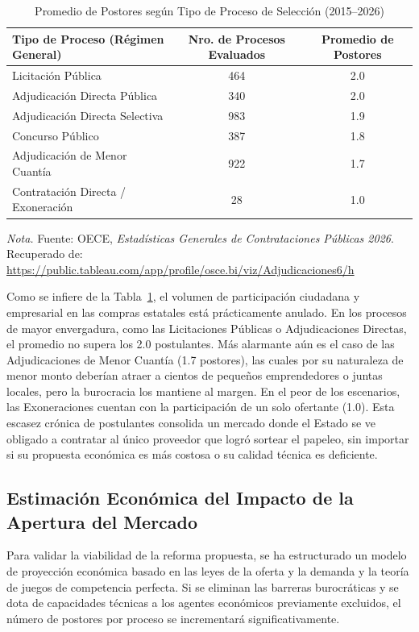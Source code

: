\documentclass[12pt,a4paper]{article}
\begin{document}
\begin{table}[htbp]
\caption{Promedio de Postores según Tipo de Proceso de Selección (2015--2026)}
\label{tab:promedio_postores}
\centering
\begin{tabular}{lcc}
\toprule
\textbf{Tipo de Proceso (Régimen General)} & \textbf{Nro. de Procesos Evaluados} & \textbf{Promedio de Postores} \\
\midrule
Licitación Pública                      & 464 & 2.0 \\
Adjudicación Directa Pública            & 340 & 2.0 \\
Adjudicación Directa Selectiva          & 983 & 1.9 \\
Concurso Público                        & 387 & 1.8 \\
Adjudicación de Menor Cuantía           & 922 & 1.7 \\
Contratación Directa / Exoneración      &  28 & 1.0 \\
\bottomrule
\end{tabular}
\vspace{0.2cm}
\begin{flushleft}
\small \textit{Nota.} Fuente: OECE, \textit{Estadísticas Generales de Contrataciones Públicas 2026}. Recuperado de: \url{https://public.tableau.com/app/profile/osce.bi/viz/Adjudicaciones6/h}
\end{flushleft}
\end{table}

Como se infiere de la Tabla~\ref{tab:promedio_postores}, el volumen de participación ciudadana y empresarial en las compras estatales está prácticamente anulado. En los procesos de mayor envergadura, como las Licitaciones Públicas o Adjudicaciones Directas, el promedio no supera los 2.0 postulantes. Más alarmante aún es el caso de las Adjudicaciones de Menor Cuantía (1.7 postores), las cuales por su naturaleza de menor monto deberían atraer a cientos de pequeños emprendedores o juntas locales, pero la burocracia los mantiene al margen. En el peor de los escenarios, las Exoneraciones cuentan con la participación de un solo ofertante (1.0). Esta escasez crónica de postulantes consolida un mercado donde el Estado se ve obligado a contratar al único proveedor que logró sortear el papeleo, sin importar si su propuesta económica es más costosa o su calidad técnica es deficiente.

\subsection{Estimación Económica del Impacto de la Apertura del Mercado}
Para validar la viabilidad de la reforma propuesta, se ha estructurado un modelo de proyección económica basado en las leyes de la oferta y la demanda y la teoría de juegos de competencia perfecta. Si se eliminan las barreras burocráticas y se dota de capacidades técnicas a los agentes económicos previamente excluidos, el número de postores por proceso se incrementará significativamente.
\end{document}
